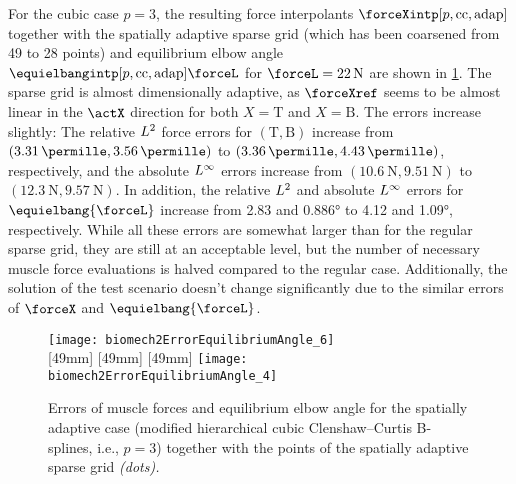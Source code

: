 For the cubic case $p = 3$,
the resulting force interpolants $\forceXintp[p,\cc,\mathrm{adap}]$ together
with the spatially adaptive sparse grid
(which has been coarsened from 49 to 28 points) and
equilibrium elbow angle $\equielbangintp[p,\cc,\mathrm{adap}]{\forceL}$
for $\forceL = \SI{22}{\newton}$ are shown in
\cref{fig:biomech2SpatiallyAdaptive}.
The sparse grid is almost dimensionally adaptive,
as $\forceXref$ seems to be almost linear in the $\actX$ direction
for both $X = \mathrm{T}$ and $X = \mathrm{B}$.
The errors increase slightly:
The relative $L^2$ force errors for $(\mathrm{T}, \mathrm{B})$ increase
from $(\SI{3.31}{\permille}, \SI{3.56}{\permille})$
to $(\SI{3.36}{\permille}, \SI{4.43}{\permille})$, respectively,
and the absolute $L^\infty$ errors increase
from $(\SI{10.6}{\newton}, \SI{9.51}{\newton})$
to $(\SI{12.3}{\newton}, \SI{9.57}{\newton})$.
In addition, the relative $L^2$ and absolute $L^\infty$ errors
for $\equielbang{\forceL}$ increase
from \SI{2.83}{\permille} and \ang{0.886}
to \SI{4.12}{\permille} and \ang{1.09}, respectively.
While all these errors are somewhat larger than for the regular sparse grid,
they are still at an acceptable level,
but the number of necessary muscle force evaluations is halved compared
to the regular case.
Additionally, the solution of the test scenario doesn't change significantly
due to the similar errors of $\forceX$ and $\equielbang{\forceL}$.

\begin{figure}
  \hspace*{2mm}%
  \hspace*{12mm}%
  \texttt{[image: biomech2ErrorEquilibriumAngle\_6]}%
  \\[2mm]%
  [49mm]{%
  }%
  \hfill%
  [49mm]{%
  }%
  \hfill%
  [49mm]{%
    \texttt{[image: biomech2ErrorEquilibriumAngle\_4]}%
  }%
  \caption[%
    Errors of muscle forces and equilibrium angle
    for the spatially adaptive case%
  ]{%
    Errors of muscle forces and equilibrium elbow angle
    for the spatially adaptive case
    (modified hierarchical cubic Clenshaw--Curtis B-splines,
    i.e., $p = 3$) together with the points of the
    spatially adaptive sparse grid \emph{(dots).}%
  }%
  \label{fig:biomech2SpatiallyAdaptive}%
\end{figure}
